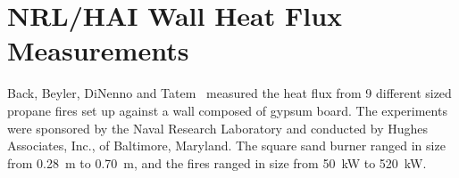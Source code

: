 %
%
%
%
%


\section{NRL/HAI Wall Heat Flux Measurements}

Back, Beyler, DiNenno and Tatem~\cite{Back:IAFSS4} measured the heat flux from 9 different sized propane fires set up against a wall composed
of gypsum board. The experiments were sponsored by the Naval Research Laboratory and conducted by Hughes Associates, Inc., of Baltimore, Maryland. The
square sand burner ranged in size from 0.28~m to 0.70~m, and the fires ranged in size from 50~kW to 520~kW.

